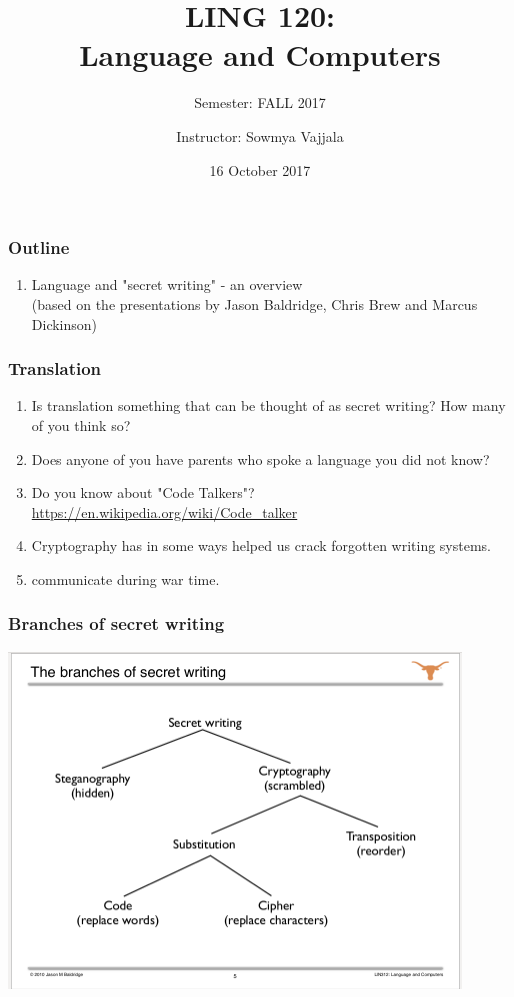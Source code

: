 \documentclass{beamer}
\author[Sowmya Vajjala]{Instructor: Sowmya Vajjala}
\title[LING 120]{LING 120: \\ Language and Computers}
\subtitle{Semester: FALL 2017}
\date{16 October 2017}
\institute{Iowa State University, USA}
\begin{document}
\begin{frame}\titlepage
\end{frame}

\begin{frame}
\frametitle{Outline}
\begin{enumerate}
\item Language and "secret writing" - an overview
\\ (based on the presentations by Jason Baldridge, Chris Brew and Marcus Dickinson)
\end{enumerate}
\end{frame}

\begin{frame}
\frametitle{Translation}
\begin{enumerate}
\item Is translation something that can be thought of as secret writing? How many of you think so? \pause
\item Does anyone of you have parents who spoke a language you did not know? \pause
\item Do you know about "Code Talkers"? \url{https://en.wikipedia.org/wiki/Code\_talker} \pause
\item Cryptography has in some ways helped us crack forgotten writing systems. 
\item communicate during war time.
\end{enumerate}
\end{frame}

\begin{frame}
\frametitle{Branches of secret writing}
\includegraphics[width=0.9\textwidth]{crypto.png}
\end{frame}
\end{document}
